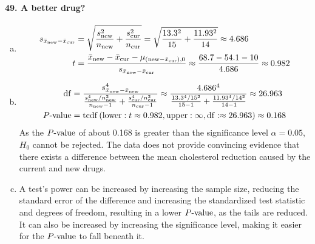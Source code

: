 \documentclass[../Homework]{subfiles}
\begin{document}
		\paragraph{49. A better drug?}
			\begin{enumerate}[a.]
				\item
					\begin{align*}
						s_{\bar{x}_{\mathrm{new}} - \bar{x}_{\mathrm{cur}}} &= \sqrt{\frac{s_{\mathrm{new}}^2}{n_{\mathrm{new}}} + \frac{s_{\mathrm{cur}}^2}{n_{\mathrm{cur}}}} = \sqrt{\frac{13.3^2}{15} + \frac{11.93^2}{14}} \approx 4.686 \\
						t &= \frac{\bar{x}_\mathrm{new} - \bar{x}_{\mathrm{cur}} - \mu_{(\mathrm{new} - \bar{x}_{\mathrm{cur}}),0}}{s_{\bar{x}_{\mathrm{new}} - \bar{x}_{\mathrm{cur}}}} \approx \frac{68.7 - 54.1 - 10}{4.686} \approx 0.982
					\end{align*}
				\item
					\begin{align*}
						\operatorname{df} &= \frac{s_{\bar{x}_{\mathrm{new}} - \bar{x}_{\mathrm{new}}}^4}{\frac{s_{\mathrm{new}}^4/n_{\mathrm{new}}^2}{n_{\mathrm{new}} - 1} + \frac{s_{\mathrm{cur}}^4/n_{\mathrm{cur}}^2}{n_{\mathrm{cur}} - 1}} \approx \frac{4.686^4}{\frac{13.3^4/15^2}{15 - 1} + \frac{11.93^4/14^2}{14 - 1}} \approx 26.963 \\
						P\text{-value} &= \operatorname{tcdf}\left(\operatorname{lower}: t \approx 0.982, \operatorname{upper}: \infty, \operatorname{df}: \approx 26.963\right) \approx 0.168
					\end{align*}
					As the $P\text{-value}$ of about 0.168 is greater than the significance level $\alpha = 0.05$, $H_0$ cannot be rejected. The data does not provide convincing evidence that there exists a difference between the mean cholesterol reduction caused by the current and new drugs.
				\item
					A test's power can be increased by increasing the sample size, reducing the standard error of the difference and increasing the standardized test statistic and degrees of freedom, resulting in a lower $P\text{-value}$, as the tails are reduced. It can also be increased by increasing the significance level, making it easier for the $P\text{-value}$ to fall beneath it.
			\end{enumerate}
\end{document}

